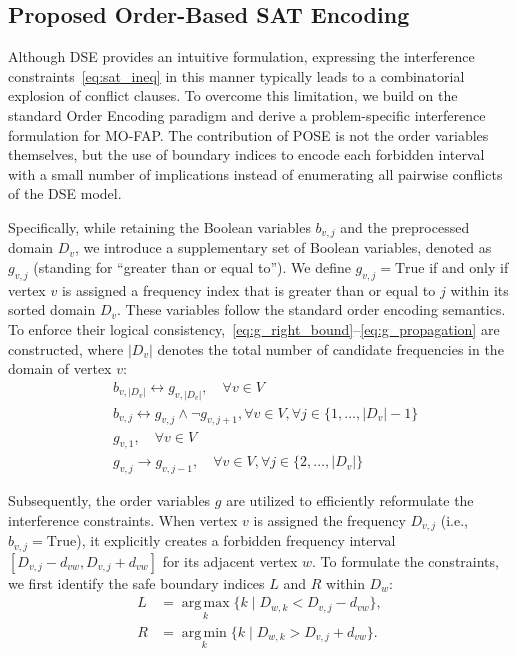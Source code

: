 \documentclass[letterpaper,journal]{IEEEtran}
\begin{document}
\subsection{Proposed Order-Based SAT Encoding}
\label{subsec:order_encoding}
Although DSE provides an intuitive formulation, expressing the interference constraints~\eqref{eq:sat_ineq} in this manner typically leads to a combinatorial explosion of conflict clauses. To overcome this limitation, we build on the standard Order Encoding paradigm \cite{Petke2011Order_encoding} and derive a problem-specific interference formulation for MO-FAP. The contribution of POSE is not the order variables themselves, but the use of boundary indices to encode each forbidden interval with a small number of implications instead of enumerating all pairwise conflicts of the DSE model.

Specifically, while retaining the Boolean variables $b_{v,j}$ and the preprocessed domain $D_v$, we introduce a supplementary set of Boolean variables, denoted as $g_{v,j}$ (standing for ``greater than or equal to''). We define $g_{v,j} = \text{True}$ if and only if vertex $v$ is assigned a frequency index that is greater than or equal to $j$ within its sorted domain $D_v$. These variables follow the standard order encoding semantics. To enforce their logical consistency,~\eqref{eq:g_right_bound}--\eqref{eq:g_propagation} are constructed, where $|D_v|$ denotes the total number of candidate frequencies in the domain of vertex $v$:
\begin{align}
    & b_{v,|D_v|} \leftrightarrow g_{v,|D_v|}, \quad \forall v \in V \label{eq:g_right_bound} \\
    & b_{v,j} \leftrightarrow g_{v,j} \wedge \neg g_{v,j+1}, \forall v \in V, \forall j \in \{1, \dots, |D_v|-1\} \label{eq:g_b_connect} \\
    & g_{v,1}, \quad \forall v \in V \label{eq:g_left_bound} \\
    & g_{v,j} \rightarrow g_{v,j-1}, \quad \forall v \in V, \forall j \in \{2, \dots, |D_v|\} \label{eq:g_propagation}
\end{align}

Subsequently, the order variables $g$ are utilized to efficiently reformulate the interference constraints. When vertex $v$ is assigned the frequency $D_{v,j}$ (i.e., $b_{v,j} = \text{True}$), it explicitly creates a forbidden frequency interval $[D_{v,j} - d_{vw}, D_{v,j} + d_{vw}]$ for its adjacent vertex $w$. To formulate the constraints, we first identify the safe boundary indices $L$ and $R$ within $D_w$:
\begin{align}
    L &= \operatorname{arg\,max}\limits_{k} \{ k \mid D_{w,k} < D_{v,j} - d_{vw} \}, \label{eq:forbid_L} \\
    R &= \operatorname{arg\,min}\limits_{k} \{ k \mid D_{w,k} > D_{v,j} + d_{vw} \}. \label{eq:forbid_R}
\end{align}
\end{document}
